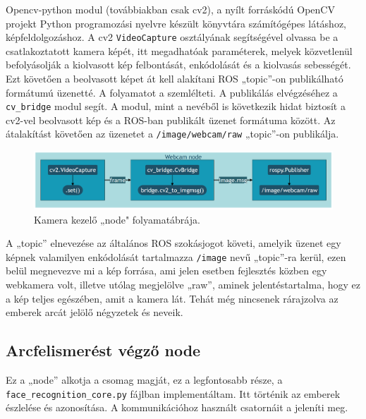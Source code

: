 Opencv-python modul (továbbiakban csak cv2), a nyílt forráskódú OpenCV projekt Python programozási nyelvre készült könyvtára számítógépes látáshoz, képfeldolgozáshoz. A cv2 \verb|VideoCapture| osztályának segítségével olvassa be a csatlakoztatott kamera képét, itt megadhatóak paraméterek, melyek közvetlenül befolyásolják a kiolvasott kép felbontását, enkódolását és a kiolvasás sebességét. Ezt követően a beolvasott képet át kell alakítani ROS „topic”-on publikálható formátumú üzenetté. A folyamatot a  szemlélteti. A publikálás elvégzéséhez a \verb|cv_bridge| modul segít. A modul, mint a nevéből is következik hidat biztosít a cv2-vel beolvasott kép és a ROS-ban publikált üzenet formátuma között. Az átalakítást követően az üzenetet a \verb|/image/webcam/raw| „topic”-on publikálja.
\begin{figure}[!ht]
    \centering
    \includegraphics[width=150mm, keepaspectratio]{02_mermaid/webcam_node3.png}
    \caption{Kamera kezelő „node" folyamatábrája.}
    \label{fig:wcp}
\end{figure}

A „topic” elnevezése az általános ROS szokásjogot követi, amelyik üzenet egy képnek valamilyen enkódolását tartalmazza \verb|/image| nevű „topic”-ra kerül, ezen belül megnevezve mi a kép forrása, ami jelen esetben fejlesztés közben egy webkamera volt, illetve utólag megjelölve „raw”, aminek jelentéstartalma, hogy ez a kép teljes egészében, amit a kamera lát. Tehát még nincsenek rárajzolva az emberek arcát jelölő négyzetek és neveik.

\subsection{Arcfelismerést végző node}
Ez a „node” alkotja a csomag magját, ez a legfontosabb része, a \verb|face_recognition_core.py| fájlban implementáltam. Itt történik az emberek észlelése és azonosítása. A kommunikációhoz használt csatornáit a  jeleníti meg.

